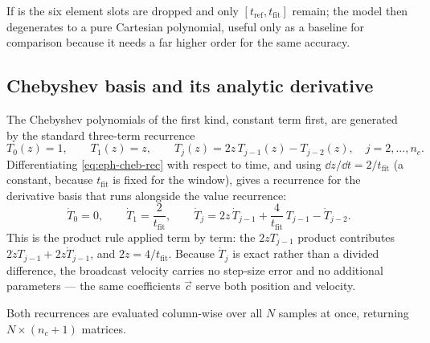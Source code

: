 If  is  the six element slots are
dropped and only $[t_\mathrm{ref}, t_\mathrm{fit}]$ remain; the model then
degenerates to a pure Cartesian polynomial, useful only as a baseline for
comparison because it needs a far higher order for the same accuracy.

\subsection{Chebyshev basis and its analytic derivative}

The Chebyshev polynomials of the first kind, constant term first, are
generated by the standard three-term recurrence
\citep[Eqs.~7.1--7.2]{iiyama2026thesis}
\begin{equation}
  \label{eq:eph-cheb-rec}
  T_0(z) = 1,
  \qquad
  T_1(z) = z,
  \qquad
  T_j(z) = 2z\,T_{j-1}(z) - T_{j-2}(z),
  \quad j = 2,\dots,n_c .
\end{equation}
Differentiating \cref{eq:eph-cheb-rec} with respect to time, and using
$\dd z/\dd t = 2/t_\mathrm{fit}$ (a constant, because $t_\mathrm{fit}$ is
fixed for the window), gives a recurrence for the derivative basis that runs
alongside the value recurrence:
\begin{equation}
  \label{eq:eph-cheb-dt}
  \dot T_0 = 0,
  \qquad
  \dot T_1 = \frac{2}{t_\mathrm{fit}},
  \qquad
  \dot T_j = 2z\,\dot T_{j-1} + \frac{4}{t_\mathrm{fit}}\,T_{j-1} - \dot T_{j-2}.
\end{equation}
This is the product rule applied term by term: the $2z T_{j-1}$ product
contributes $2\dot z T_{j-1} + 2z\dot T_{j-1}$, and $2\dot z = 4/t_\mathrm{fit}$.
Because $\dot T_j$ is exact rather than a divided difference, the broadcast
velocity carries no step-size error and no additional parameters --- the same
coefficients $\vec{c}$ serve both position and velocity.

Both recurrences are evaluated column-wise over all $N$ samples at once,
returning $N\times(n_c+1)$ matrices.

